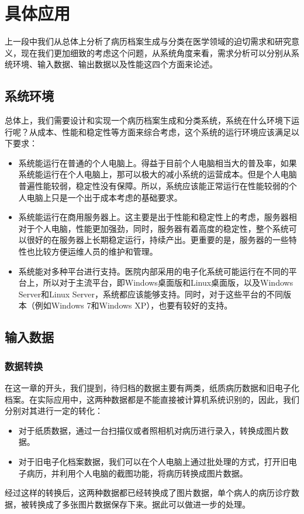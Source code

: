 \section{具体应用}
上一段中我们从总体上分析了病历档案生成与分类在医学领域的迫切需求和研究意义，现在我们更加细致的考虑这个问题，从系统角度来看，需求分析可以分别从系统环境、输入数据、输出数据以及性能这四个方面来论述。

\subsection{系统环境}
总体上，我们需要设计和实现一个病历档案生成和分类系统，系统在什么环境下运行呢？从成本、性能和稳定性等方面来综合考虑，这个系统的运行环境应该满足以下要求：
\begin{itemize}
	\item 系统能运行在普通的个人电脑上。得益于目前个人电脑相当大的普及率，如果系统能运行在个人电脑上，那可以极大的减小系统的运营成本。但是个人电脑普遍性能较弱，稳定性没有保障。所以，系统应该能正常运行在性能较弱的个人电脑上只是一个出于成本考虑的基础要求。
	\item 系统能运行在商用服务器上。这主要是出于性能和稳定性上的考虑，服务器相对于个人电脑，性能更加强劲，同时，服务器有着高度的稳定性，整个系统可以很好的在服务器上长期稳定运行，持续产出。更重要的是，服务器的一些特性也比较方便运维人员的维护和管理。
	\item 系统能对多种平台进行支持。医院内部采用的电子化系统可能运行在不同的平台上，所以对于主流平台，即Windows桌面版和Linux桌面版，以及Windows Server和Linux Server，系统都应该能够支持。同时，对于这些平台的不同版本（例如Windows 7和Windows XP），也要有较好的支持。
\end{itemize}

\subsection{输入数据}
\subsubsection*{数据转换}
在这一章的开头，我们提到，待归档的数据主要有两类，纸质病历数据和旧电子化档案。在实际应用中，这两种数据都是不能直接被计算机系统识别的，因此，我们分别对其进行一定的转化：
\begin{itemize}
	\item 对于纸质数据，通过一台扫描仪或者照相机对病历进行录入，转换成图片数据。
	\item 对于旧电子化档案数据，我们可以在个人电脑上通过批处理的方式，打开旧电子病历，并利用个人电脑的截图功能，将病历转换成图片数据。
\end{itemize}
经过这样的转换后，这两种数据都已经转换成了图片数据，单个病人的病历诊疗数据，被转换成了多张图片数据保存下来。据此可以做进一步的处理。

